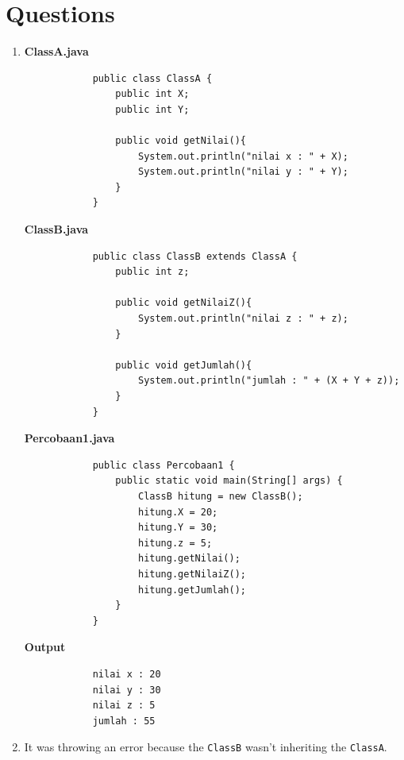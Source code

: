 \documentclass[12pt,titlepage]{article}
\begin{document}
\section{Questions}
\begin{enumerate}
    \item {
        \textbf{ClassA.java}
        \begin{verbatim}
            public class ClassA {
                public int X;
                public int Y;

                public void getNilai(){
                    System.out.println("nilai x : " + X);
                    System.out.println("nilai y : " + Y);
                }
            }
        \end{verbatim}
        \textbf{ClassB.java}
        \begin{verbatim}
            public class ClassB extends ClassA {
                public int z;

                public void getNilaiZ(){
                    System.out.println("nilai z : " + z);
                }

                public void getJumlah(){
                    System.out.println("jumlah : " + (X + Y + z));
                }
            }
        \end{verbatim}
        \textbf{Percobaan1.java}
        \begin{verbatim}
            public class Percobaan1 {
                public static void main(String[] args) {
                    ClassB hitung = new ClassB();
                    hitung.X = 20;
                    hitung.Y = 30;
                    hitung.z = 5;
                    hitung.getNilai();
                    hitung.getNilaiZ();
                    hitung.getJumlah();
                }
            }
        \end{verbatim}
        \pagebreak
        \textbf{Output}
        \begin{verbatim}
            nilai x : 20
            nilai y : 30
            nilai z : 5
            jumlah : 55
        \end{verbatim}
    }
    \item {
        It was throwing an error because the \texttt{ClassB} wasn't inheriting the \texttt{ClassA}.
    }
\end{enumerate}
\end{document}
